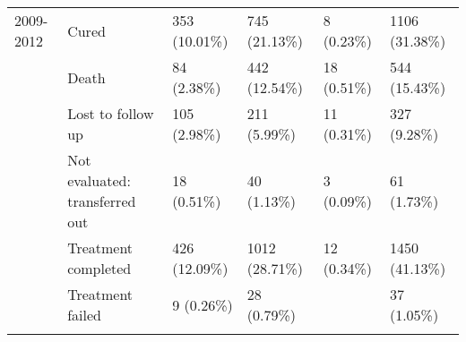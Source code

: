 \documentclass{article}
\begin{document}
\begin{landscape}
\begin{table}[!htbp]
\begin{tabular}{@{\extracolsep{5pt}} llllll}
2009-2012 & Cured & 353 (10.01\%) & 745 (21.13\%) & 8 (0.23\%) & 1106 (31.38\%) \\ 
 & Death & 84 (2.38\%) & 442 (12.54\%) & 18 (0.51\%) & 544 (15.43\%) \\ 
 & Lost to follow up & 105 (2.98\%) & 211 (5.99\%) & 11 (0.31\%) & 327 (9.28\%) \\ 
 & Not evaluated: transferred out & 18 (0.51\%) & 40 (1.13\%) & 3 (0.09\%) & 61 (1.73\%) \\ 
 & Treatment completed & 426 (12.09\%) & 1012 (28.71\%) & 12 (0.34\%) & 1450 (41.13\%) \\ 
 & Treatment failed & 9 (0.26\%) & 28 (0.79\%) &  & 37 (1.05\%) \\ 
\hline \\[-1.8ex] 
\end{tabular} 
\end{table} 

\end{landscape}
\end{document}

